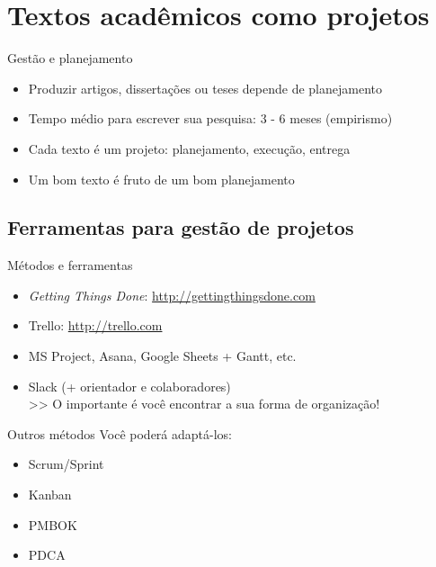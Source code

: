 
\section{Textos acadêmicos como projetos}

\begin{frame}{Gestão e planejamento}
\begin{itemize}
\item Produzir artigos, dissertações ou teses depende de planejamento
\item Tempo médio para escrever sua pesquisa: 3 - 6 meses (empirismo) 
\item Cada texto é um projeto: planejamento, execução, entrega
\item Um bom texto é fruto de um bom planejamento
\end{itemize}
\end{frame}

\subsection*{Ferramentas para gestão de projetos}

\begin{frame}{Métodos e ferramentas}
\begin{itemize}
\item \textit{Getting Things Done}: \url{http://gettingthingsdone.com}
\item Trello: \url{http://trello.com}
\item MS Project, Asana, Google Sheets + Gantt, etc.
\item Slack (+ orientador e colaboradores) \\
>> O importante é você encontrar a sua forma de organização!
\end{itemize}
\end{frame}

\begin{frame}{Outros métodos}
Você poderá adaptá-los:
\begin{itemize}
\item Scrum/Sprint
\item Kanban
\item PMBOK
\item PDCA
\end{itemize}
\end{frame}


